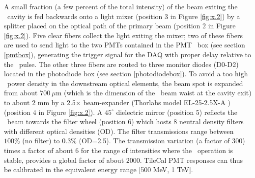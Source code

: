 A small fraction (a few percent of the total intensity) of the beam exiting the \laser~cavity is fed backwards onto a light mixer (position 3 in Figure 
\ref{fig:x.2}) by a splitter placed on the optical path of the primary beam
(position 2 in Figure \ref{fig:x.2}). Five clear fibers collect the light exiting
the mixer; two of these fibers are used to send light to the two PMTs contained in the PMT
~box (see section \ref{pmtbox}), generating the trigger signal for the DAQ with proper delay
relative to the \laser~pulse. The other three fibers are routed to three monitor
diodes (D0-D2) located in the photodiode box (see section \ref{photodiodebox}).  To avoid a too high \laser~power density in the downstream optical elements, the beam spot is expanded from
about $700 ~\mu$m
(which is the dimension of the \laser~beam waist at the cavity exit) to about 2 mm by
a 2.5$\times$ beam-expander (Thorlabs model EL-25-2.5X-A \cite{ref:thorlab}) (position 4 in Figure
\ref{fig:x.2}). A $45^{\circ}$ dielectric mirror (position 5) reflects the \laser~beam towards the filter wheel (position 6) which hosts 8 neutral density filters
with different optical densities (OD). The filter transmissions range between $100\%$
(no filter) to $0.3\%$ (OD=2.5). The transmission variation (a factor of 300) times a
factor of about 6 for the range of intensities where the \laser~operation is stable,
provides a global factor of about 2000. TileCal  PMT responses can thus be calibrated in the
equivalent energy range [500 MeV, 1 TeV].

